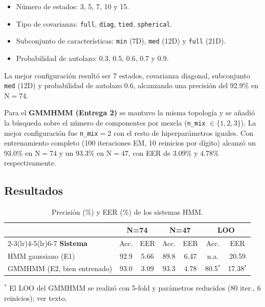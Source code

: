 \documentclass[11pt,a4paper]{article}
\begin{document}
\begin{itemize}
  \item N\'{u}mero de estados: 3, 5, 7, 10 y 15.
  \item Tipo de covarianza: \texttt{full}, \texttt{diag}, \texttt{tied},
        \texttt{spherical}.
  \item Subconjunto de caracter\'{i}sticas: \texttt{min} (7D), \texttt{med} (12D)
        y \texttt{full} (21D).
  \item Probabilidad de autolazo: 0.3, 0.5, 0.6, 0.7 y 0.9.
\end{itemize}

La mejor configuraci\'{o}n result\'{o} ser 7 estados, covarianza diagonal,
subconjunto \texttt{med} (12D) y probabilidad de autolazo 0.6, alcanzando
una precisi\'{o}n del 92.9\% en N$=$74.

Para el \textbf{GMMHMM (Entrega 2)} se mantuvo la misma topolog\'{i}a y se
a\~{n}adi\'{o} la b\'{u}squeda sobre el n\'{u}mero de componentes por mezcla
(\texttt{n\_mix} $\in \{1, 2, 3\}$). La mejor configuraci\'{o}n fue
\texttt{n\_mix}$=$2 con el resto de hiperpar\'{a}metros iguales. Con entrenamiento
completo (100 iteraciones EM, 10 reinicios por d\'{i}gito) alcanz\'{o} un 93.0\% en
N$=$74 y un 93.3\% en N$=$47, con EER de 3.09\% y 4.78\% respectivamente.

\subsection{Resultados}

\begin{table}[H]
  \centering
  \caption{Precisi\'{o}n (\%) y EER (\%) de los sistemas HMM.}
  \label{tab:hmm}
  \begin{tabular}{lcccccc}
    \toprule
    & \multicolumn{2}{c}{\textbf{N=74}} & \multicolumn{2}{c}{\textbf{N=47}}
    & \multicolumn{2}{c}{\textbf{LOO}} \\
    \cmidrule(lr){2-3}\cmidrule(lr){4-5}\cmidrule(lr){6-7}
    \textbf{Sistema} & Acc. & EER & Acc. & EER & Acc. & EER \\
    \midrule
    HMM gaussiano (E1) & 92.9 & 5.66 & 89.8 & 6.47 & n.a. & 20.59 \\
    GMMHMM (E2, bien entrenado) & 93.0 & 3.09 & 93.3 & 4.78 & 80.5$^{*}$ & 17.38$^{*}$ \\
    \bottomrule
  \end{tabular}

  \smallskip
  \small $^{*}$ El LOO del GMMHMM se realiz\'{o} con 5-fold y par\'{a}metros reducidos
  (80 iter., 6 reinicios); ver texto.
\end{table}
\end{document}
